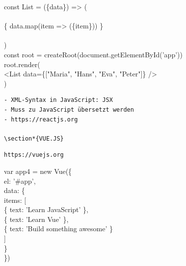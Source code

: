 const List = (\{data\}) => (\\
\\
\{ data.map(item => (\{item\})) \}\\
\\
)\\
const root = createRoot(document.getElementById('app'))\\
root.render(\\[0pt]
<List data=\{["Maria", "Hans", "Eva", "Peter"]\} />\\
)

\begin{verbatim}
- XML-Syntax in JavaScript: JSX
- Muss zu JavaScript übersetzt werden
- https://reactjs.org

\section*{VUE.JS}
\end{verbatim}

\begin{verbatim}
https://vuejs.org
\end{verbatim}

var app4 = new Vue(\{\\
el: '\#app',\\
data: \{\\
items: [\\
\{ text: 'Learn JavaScript' \},\\
\{ text: 'Learn Vue' \},\\
\{ text: 'Build something awesome' \}\\[0pt]
]\\
\}\\
\})

